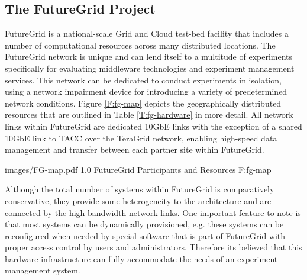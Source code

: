 \subsection{The FutureGrid Project}


FutureGrid is a national-scale Grid and Cloud test-bed facility that includes a number of computational resources across many distributed locations. The FutureGrid network is unique and can lend itself to a multitude of experiments specifically for evaluating middleware technologies and experiment management services.  This network can be dedicated to conduct experiments in isolation, using a network impairment device for introducing a variety of predetermined network conditions. Figure \ref{F:fg-map} depicts the geographically distributed resources that are outlined in Table \ref{T:fg-hardware} in more detail. All network links within FutureGrid are dedicated 10GbE links with the exception of a shared 10GbE link to TACC over the TeraGrid \cite{berman2001tkg, catlett2002philosophy} network, enabling high-speed data management and transfer between each partner site within FutureGrid.
   
  {images/FG-map.pdf}
  {1.0}
  {FutureGrid Participants and Resources}
  {F:fg-map}

Although the total number of systems within FutureGrid is comparatively conservative, they provide some heterogeneity to the architecture and are connected by the high-bandwidth network links. One important feature to note is that most systems can be dynamically provisioned, e.g. these systems can be reconfigured when needed by special software that is part of FutureGrid with proper access control by users and administrators.  Therefore its believed that this hardware infrastructure can fully accommodate the needs of an experiment management system.


